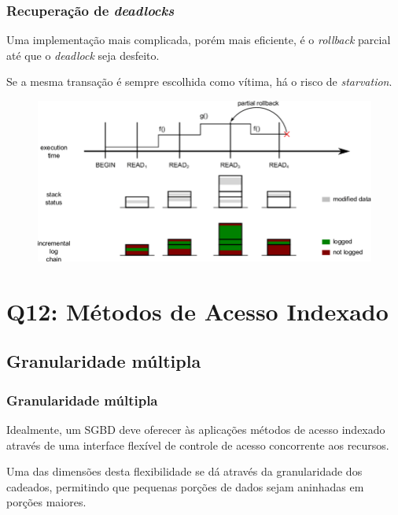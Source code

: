 \documentclass{beamer}
\begin{document}
\begin{frame} %
    \frametitle{Recuperação de \emph{deadlocks}}
    Uma implementação mais complicada, porém mais eficiente, é o \emph{rollback} parcial até que o \emph{deadlock} seja desfeito.

    \medskip
    Se a mesma transação é sempre escolhida como vítima, há o risco de \emph{starvation}.

    \medskip
    \begin{figure}
        \includegraphics[width=0.8\linewidth]{partialrollback.png}
    \end{figure}

\end{frame}

\section{Q12: Métodos de Acesso Indexado}

\subsection{Granularidade múltipla}

\begin{frame} %
    \frametitle{Granularidade múltipla}
    
    Idealmente, um SGBD deve oferecer às aplicações métodos de acesso indexado através de uma interface flexível de controle de acesso concorrente aos recursos.
    
    \medskip
    Uma das dimensões desta flexibilidade se dá através da granularidade dos cadeados, permitindo que pequenas porções de dados sejam aninhadas em porções maiores.
\end{frame}
\end{document}

